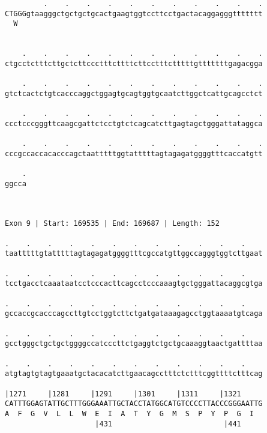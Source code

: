\documentclass{article}
\begin{document}
\begin{Verbatim}
         .    .    .    .    .    .    .    .    .    .    .
CTGGGgtaagggctgctgctgcactgaagtggtccttcctgactacaggagggttttttt
  W                                                         
                                                            
  
    .    .    .    .    .    .    .    .    .    .    .    .
ctgcctctttcttgctcttccctttcttttcttcctttctttttgtttttttgagacgga
                                                            
    .    .    .    .    .    .    .    .    .    .    .    .
gtctcactctgtcacccaggctggagtgcagtggtgcaatcttggctcattgcagcctct
                                                            
    .    .    .    .    .    .    .    .    .    .    .    .
ccctcccgggttcaagcgattctcctgtctcagcatcttgagtagctgggattataggca
                                                            
    .    .    .    .    .    .    .    .    .    .    .    .
cccgccaccacacccagctaatttttggtatttttagtagagatggggtttcaccatgtt
                                                            
    .
ggcca
     
     
 
Exon 9 | Start: 169535 | End: 169687 | Length: 152
 
.    .    .    .    .    .    .    .    .    .    .    .    
taatttttgtatttttagtagagatggggtttcgccatgttggccagggtggtcttgaat
                                                            
.    .    .    .    .    .    .    .    .    .    .    .    
tcctgacctcaaataatcctcccacttcagcctcccaaagtgctgggattacaggcgtga
                                                            
.    .    .    .    .    .    .    .    .    .    .    .    
gccaccgcacccagccttgtcctggtcttctgatgataaagagcctggtaaaatgtcaga
                                                            
.    .    .    .    .    .    .    .    .    .    .    .    
gcctgggctgctgctggggccatcccttctgaggtctgctgcaaaggtaactgattttaa
                                                            
.    .    .    .    .    .    .    .    .    .    .    .    
atgtagtgtagtgaaatgctacacatcttgaacagcctttctctttcggttttctttcag
                                                            
|1271     |1281     |1291     |1301     |1311     |1321     
CATTTGGAGTATTGCTTTGGGAAATTGCTACCTATGGCATGTCCCCTTACCCGGGAATTG
A  F  G  V  L  L  W  E  I  A  T  Y  G  M  S  P  Y  P  G  I  
                     |431                          |441     
  

\end{Verbatim}
\end{document}
